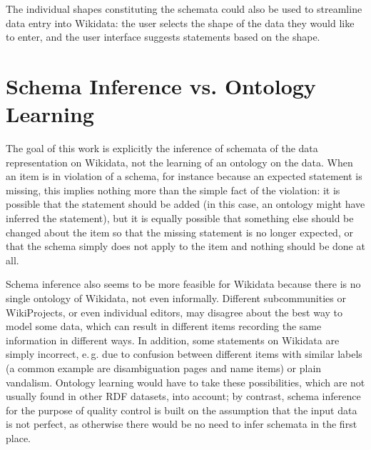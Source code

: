 \documentclass{scrartcl}
\begin{document}
The individual shapes constituting the schemata could also be used to streamline data entry into Wikidata:
the user selects the shape of the data they would like to enter,
and the user interface suggests statements based on the shape.

\section{Schema Inference vs. Ontology Learning}

The goal of this work is explicitly the inference of schemata of the data representation on Wikidata,
not the learning of an ontology on the data.
When an item is in violation of a schema,
for instance because an expected statement is missing,
this implies nothing more than the simple fact of the violation:
it is possible that the statement should be added
(in this case, an ontology might have inferred the statement),
but it is equally possible that something else should be changed about the item so that the missing statement is no longer expected,
or that the schema simply does not apply to the item and nothing should be done at all.

Schema inference also seems to be more feasible for Wikidata because there is no single ontology of Wikidata, not even informally.
Different subcommunities or WikiProjects, or even individual editors, may disagree about the best way to model some data,
which can result in different items recording the same information in different ways.
In addition, some statements on Wikidata are simply incorrect, e.\,g. due to confusion between different items with similar labels
(a common example are disambiguation pages and name items)
or plain vandalism.
Ontology learning would have to take these possibilities, which are not usually found in other RDF datasets, into account;
by contrast, schema inference for the purpose of quality control is built on the assumption that the input data is not perfect,
as otherwise there would be no need to infer schemata in the first place.



\end{document}
